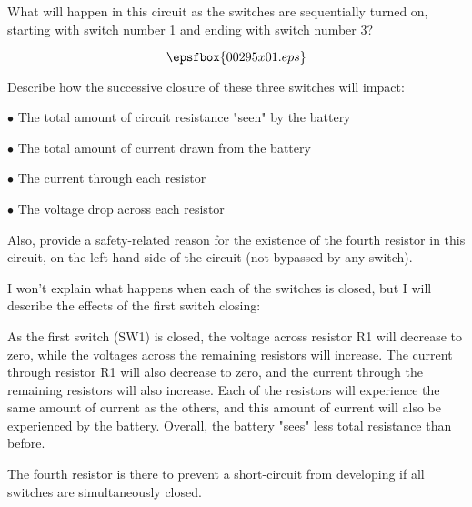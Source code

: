 

What will happen in this circuit as the switches are sequentially turned on, starting with switch number 1 and ending with switch number 3?  

$$\epsfbox{00295x01.eps}$$

Describe how the successive closure of these three switches will impact:

\medskip
\item{$\bullet$} The total amount of circuit resistance "seen" by the battery
\item{$\bullet$} The total amount of current drawn from the battery
\item{$\bullet$} The current through each resistor
\item{$\bullet$} The voltage drop across each resistor 
\medskip

Also, provide a safety-related reason for the existence of the fourth resistor in this circuit, on the left-hand side of the circuit (not bypassed by any switch).







I won't explain what happens when each of the switches is closed, but I will describe the effects of the first switch closing:

As the first switch (SW1) is closed, the voltage across resistor R1 will decrease to zero, while the voltages across the remaining resistors will increase.  The current through resistor R1 will also decrease to zero, and the current through the remaining resistors will also increase.  Each of the resistors will experience the same amount of current as the others, and this amount of current will also be experienced by the battery.  Overall, the battery "sees" less total resistance than before.

The fourth resistor is there to prevent a short-circuit from developing if all switches are simultaneously closed.







